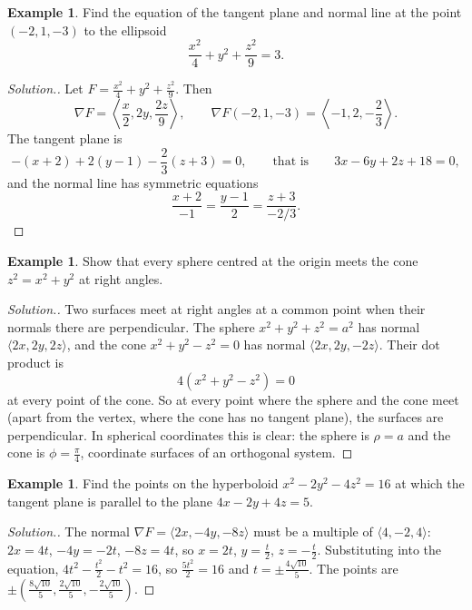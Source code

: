 \documentclass[11pt,a4paper]{article}
\theoremstyle{definition}
\newtheorem{exa}[thm]{Example}
\newenvironment{solution}
  {\renewcommand{\qedsymbol}{}\begin{proof}[\textit{Solution}.]}
  {\end{proof}}
\begin{document}
\begin{exa}
\label{ex:tangentellipsoid}
Find the equation of the tangent plane and normal line at the point $(-2,1,-3)$
to the ellipsoid
\[\frac{x^2}{4} + y^2 + \frac{z^2}{9} =3 .\]
\end{exa}

\begin{solution}
Let $F = \frac{x^2}{4} + y^2 + \frac{z^2}{9}$. Then
\[\nabla F = \left\langle \frac{x}{2}, 2y, \frac{2z}{9}\right\rangle,\qquad
\nabla F(-2,1,-3) = \left\langle -1, 2, -\frac{2}{3}\right\rangle .\]
The tangent plane is
\[-(x+2) + 2(y-1) -\frac{2}{3}(z + 3) = 0,\qquad\text{that is}\qquad 3x - 6y +
2z + 18 = 0 ,\]
and the normal line has symmetric equations
\[\frac{x + 2}{-1} = \frac{y - 1}{2} = \frac{z + 3}{-2/3} .\]
\end{solution}

\begin{exa}
\label{ex:orthogonalsurfaces}
Show that every sphere centred at the origin meets the cone $z^2 = x^2 + y^2$ at
right angles.
\end{exa}

\begin{solution}
Two surfaces meet at right angles at a common point when their normals there are
perpendicular. The sphere $x^2 + y^2 + z^2 = a^2$ has normal $\langle 2x, 2y,
2z\rangle$, and the cone $x^2 + y^2 - z^2 = 0$ has normal $\langle 2x, 2y,
-2z\rangle$. Their dot product is
\[4(x^2 + y^2 - z^2) = 0\]
at every point of the cone. So at every point where the sphere and the cone
meet (apart from the vertex, where the cone has no tangent plane), the surfaces
are perpendicular. In spherical coordinates this is clear: the sphere is
$\rho = a$ and the cone is $\phi = \frac{\pi}{4}$, coordinate surfaces of an
orthogonal system.
\end{solution}

\begin{exa}
\label{ex:tangentparallel}
Find the points on the hyperboloid $x^2 - 2y^2 - 4z^2 = 16$ at which the tangent
plane is parallel to the plane $4x - 2y + 4z = 5$.
\end{exa}

\begin{solution}
The normal $\nabla F = \langle 2x, -4y, -8z\rangle$ must be a multiple of
$\langle 4,-2,4\rangle$: $2x = 4t$, $-4y = -2t$, $-8z = 4t$, so $x = 2t$,
$y = \frac{t}{2}$, $z = -\frac{t}{2}$. Substituting into the equation,
$4t^2 - \frac{t^2}{2} - t^2 = 16$, so $\frac{5t^2}{2} = 16$ and
$t = \pm\frac{4\sqrt{10}}{5}$. The points are
$\pm\left(\frac{8\sqrt{10}}{5}, \frac{2\sqrt{10}}{5},
-\frac{2\sqrt{10}}{5}\right)$.
\end{solution}
\end{document}
